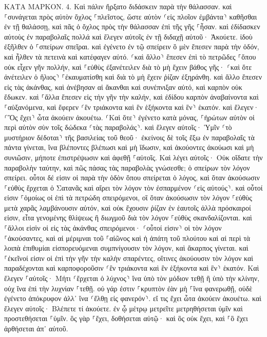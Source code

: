 \documentclass[twoside, 9pt]{extreport}
\begin{document}
ΚΑΤΑ ΜΑΡΚΟΝ.
4.
Καὶ πάλιν ἤρξατο διδάσκειν παρὰ τὴν θάλασσαν. καὶ ⸀συνάγεται πρὸς αὐτὸν ὄχλος ⸀πλεῖστος, ὥστε αὐτὸν ⸂εἰς πλοῖον ἐμβάντα⸃ καθῆσθαι ἐν τῇ θαλάσσῃ, καὶ πᾶς ὁ ὄχλος πρὸς τὴν θάλασσαν ἐπὶ τῆς γῆς ⸀ἦσαν. 
καὶ ἐδίδασκεν αὐτοὺς ἐν παραβολαῖς πολλά καὶ ἔλεγεν αὐτοῖς ἐν τῇ διδαχῇ αὐτοῦ· 
Ἀκούετε. ἰδοὺ ἐξῆλθεν ὁ ⸀σπείρων σπεῖραι. 
καὶ ἐγένετο ἐν τῷ σπείρειν ὃ μὲν ἔπεσεν παρὰ τὴν ὁδόν, καὶ ἦλθεν τὰ πετεινὰ καὶ κατέφαγεν αὐτό. 
⸂καὶ ἄλλο⸃ ἔπεσεν ἐπὶ τὸ πετρῶδες ⸀ὅπου οὐκ εἶχεν γῆν πολλήν, καὶ ⸀εὐθὺς ἐξανέτειλεν διὰ τὸ μὴ ἔχειν βάθος γῆς· 
⸂καὶ ὅτε ἀνέτειλεν ὁ ἥλιος⸃ ⸀ἐκαυματίσθη καὶ διὰ τὸ μὴ ἔχειν ῥίζαν ἐξηράνθη. 
καὶ ἄλλο ἔπεσεν εἰς τὰς ἀκάνθας, καὶ ἀνέβησαν αἱ ἄκανθαι καὶ συνέπνιξαν αὐτό, καὶ καρπὸν οὐκ ἔδωκεν. 
καὶ ⸀ἄλλα ἔπεσεν εἰς τὴν γῆν τὴν καλήν, καὶ ἐδίδου καρπὸν ἀναβαίνοντα καὶ ⸀αὐξανόμενα, καὶ ἔφερεν ⸂ἓν τριάκοντα καὶ ἓν ἑξήκοντα καὶ ἓν⸃ ἑκατόν. 
καὶ ἔλεγεν· ⸂Ὃς ἔχει⸃ ὦτα ἀκούειν ἀκουέτω. 
⸂Καὶ ὅτε⸃ ἐγένετο κατὰ μόνας, ⸀ἠρώτων αὐτὸν οἱ περὶ αὐτὸν σὺν τοῖς δώδεκα ⸂τὰς παραβολάς⸃. 
καὶ ἔλεγεν αὐτοῖς· Ὑμῖν ⸂τὸ μυστήριον δέδοται⸃ τῆς βασιλείας τοῦ θεοῦ· ἐκείνοις δὲ τοῖς ἔξω ἐν παραβολαῖς τὰ πάντα γίνεται, 
ἵνα βλέποντες βλέπωσι καὶ μὴ ἴδωσιν, καὶ ἀκούοντες ἀκούωσι καὶ μὴ συνιῶσιν, μήποτε ἐπιστρέψωσιν καὶ ἀφεθῇ ⸀αὐτοῖς. 
Καὶ λέγει αὐτοῖς· Οὐκ οἴδατε τὴν παραβολὴν ταύτην, καὶ πῶς πάσας τὰς παραβολὰς γνώσεσθε; 
ὁ σπείρων τὸν λόγον σπείρει. 
οὗτοι δέ εἰσιν οἱ παρὰ τὴν ὁδὸν ὅπου σπείρεται ὁ λόγος, καὶ ὅταν ἀκούσωσιν ⸀εὐθὺς ἔρχεται ὁ Σατανᾶς καὶ αἴρει τὸν λόγον τὸν ἐσπαρμένον ⸂εἰς αὐτούς⸃. 
καὶ οὗτοί εἰσιν ⸀ὁμοίως οἱ ἐπὶ τὰ πετρώδη σπειρόμενοι, οἳ ὅταν ἀκούσωσιν τὸν λόγον ⸀εὐθὺς μετὰ χαρᾶς λαμβάνουσιν αὐτόν, 
καὶ οὐκ ἔχουσιν ῥίζαν ἐν ἑαυτοῖς ἀλλὰ πρόσκαιροί εἰσιν, εἶτα γενομένης θλίψεως ἢ διωγμοῦ διὰ τὸν λόγον ⸀εὐθὺς σκανδαλίζονται. 
καὶ ⸀ἄλλοι εἰσὶν οἱ εἰς τὰς ἀκάνθας σπειρόμενοι· ⸂οὗτοί εἰσιν⸃ οἱ τὸν λόγον ⸀ἀκούσαντες, 
καὶ αἱ μέριμναι τοῦ ⸀αἰῶνος καὶ ἡ ἀπάτη τοῦ πλούτου καὶ αἱ περὶ τὰ λοιπὰ ἐπιθυμίαι εἰσπορευόμεναι συμπνίγουσιν τὸν λόγον, καὶ ἄκαρπος γίνεται. 
καὶ ⸀ἐκεῖνοί εἰσιν οἱ ἐπὶ τὴν γῆν τὴν καλὴν σπαρέντες, οἵτινες ἀκούουσιν τὸν λόγον καὶ παραδέχονται καὶ καρποφοροῦσιν ⸂ἓν τριάκοντα καὶ ἓν ἑξήκοντα καὶ ἓν⸃ ἑκατόν. 
Καὶ ἔλεγεν ⸀αὐτοῖς· Μήτι ⸂ἔρχεται ὁ λύχνος⸃ ἵνα ὑπὸ τὸν μόδιον τεθῇ ἢ ὑπὸ τὴν κλίνην, οὐχ ἵνα ἐπὶ τὴν λυχνίαν ⸀τεθῇ. 
οὐ γάρ ἐστιν ⸀κρυπτὸν ἐὰν μὴ ⸀ἵνα φανερωθῇ, οὐδὲ ἐγένετο ἀπόκρυφον ἀλλ᾽ ἵνα ⸂ἔλθῃ εἰς φανερόν⸃. 
εἴ τις ἔχει ὦτα ἀκούειν ἀκουέτω. 
καὶ ἔλεγεν αὐτοῖς· Βλέπετε τί ἀκούετε. ἐν ᾧ μέτρῳ μετρεῖτε μετρηθήσεται ὑμῖν καὶ προστεθήσεται ⸀ὑμῖν. 
ὃς γὰρ ⸀ἔχει, δοθήσεται αὐτῷ· καὶ ὃς οὐκ ἔχει, καὶ ⸀ὃ ἔχει ἀρθήσεται ἀπ᾽ αὐτοῦ. 
\end{document}
